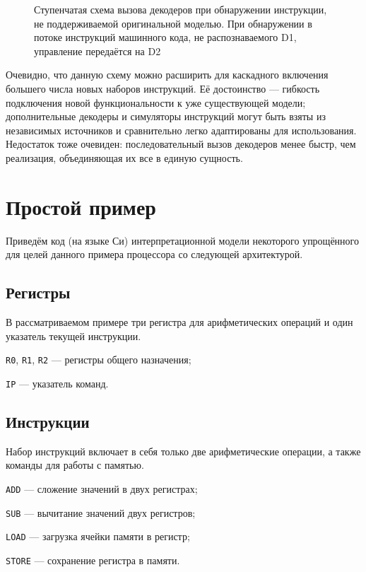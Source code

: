 \begin{figure}[h!tb]
    \centering
    \caption[Ступенчатая схема вызова декодеров]{Ступенчатая схема вызова декодеров при обнаружении инструкции, не поддерживаемой оригинальной моделью. При обнаружении в потоке инструкций машинного кода, не распознаваемого D1, управление передаётся на D2}
    \label{fig:chained-interp}
\end{figure}

Очевидно, что данную схему можно расширить для каскадного включения большего числа новых наборов инструкций. Её достоинство --- гибкость подключения новой функциональности к уже существующей модели; дополнительные декодеры и симуляторы инструкций могут быть взяты из независимых источников и сравнительно легко адаптированы для использования. Недостаток тоже очевиден: последовательный вызов декодеров менее быстр, чем реализация, объединяющая их все в единую сущность.

\section{Простой пример}

Приведём код (на языке Си) интерпретационной модели некоторого упрощённого для целей данного примера процессора со следующей архитектурой.

\subsection{Регистры}

В рассматриваемом примере три регистра для арифметических операций и один указатель текущей инструкции.
\begin{itemize*}
\item    \texttt{R0}, \texttt{R1}, \texttt{R2} --- регистры общего назначения;
\item    \texttt{IP} --- указатель команд.
\end{itemize*}

\subsection{Инструкции}

Набор инструкций включает в себя только две арифметические операции, а также команды для работы с памятью.

\begin{itemize*}
    \item \texttt{ADD} --- сложение значений в двух регистрах;
    \item \texttt{SUB} --- вычитание значений двух регистров;
    \item \texttt{LOAD} --- загрузка ячейки памяти в регистр;
    \item \texttt{STORE} --- сохранение регистра в памяти.
\end{itemize*}

